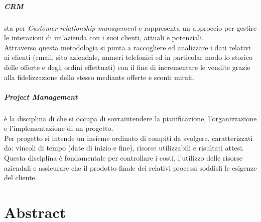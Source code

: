 \documentclass[12pt,a4paper,twoside,openany,english]{book}
\begin{document}
\paragraph*{CRM}
sta per \textit{Customer relationship management} e rappresenta un approccio per gestire le interazioni di un'azienda con i suoi clienti, attuali e potenziali.\\
Attraverso questa metodologia si punta a raccogliere ed analizzare i dati relativi ai clienti (email, sito aziendale, numeri telefonici ed in particolar modo lo storico delle offerte e degli ordini effettuati) con il fine di incrementare le vendite grazie alla fidelizzazione dello stesso mediante offerte e sconti mirati.\\
 
\paragraph*{Project Management}
è la disciplina di che si occupa di sovraintendere la pianificazione, l'organizzazione e l'implementazione di un progetto.\\ Per progetto si intende un insieme ordinato di compiti da svolgere, caratterizzati da: vincoli di tempo (date di inizio e fine), risorse utilizzabili e risultati attesi.\\
Questa disciplina è fondamentale per controllare i costi, l'utilizzo delle risorse aziendali e assicurare che il prodotto finale dei relativi processi soddisfi le esigenze del cliente.\\

\chapter*{Abstract}\label{abstract}
\end{document}
